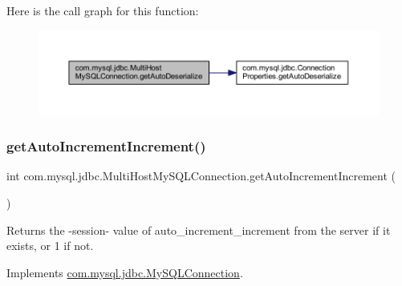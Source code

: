 Here is the call graph for this function\+:
\nopagebreak
\begin{figure}[H]
\begin{center}
\leavevmode
\includegraphics[width=350pt]{classcom_1_1mysql_1_1jdbc_1_1_multi_host_my_s_q_l_connection_aad67a9027c49b02592706d86bf9497db_cgraph}
\end{center}
\end{figure}
\mbox{\label{classcom_1_1mysql_1_1jdbc_1_1_multi_host_my_s_q_l_connection_a4b95550806cfbdb36263ec1e37a5c971}} 
\subsubsection{\texorpdfstring{get\+Auto\+Increment\+Increment()}{getAutoIncrementIncrement()}}
{\footnotesize\ttfamily int com.\+mysql.\+jdbc.\+Multi\+Host\+My\+S\+Q\+L\+Connection.\+get\+Auto\+Increment\+Increment (\begin{DoxyParamCaption}{ }\end{DoxyParamCaption})}

Returns the -\/session-\/ value of \textquotesingle{}auto\+\_\+increment\+\_\+increment\textquotesingle{} from the server if it exists, or \textquotesingle{}1\textquotesingle{} if not. 

Implements \mbox{\hyperlink{interfacecom_1_1mysql_1_1jdbc_1_1_my_s_q_l_connection_acb6ababcad41a91c6a44d300d09acff9}{com.\+mysql.\+jdbc.\+My\+S\+Q\+L\+Connection}}.

